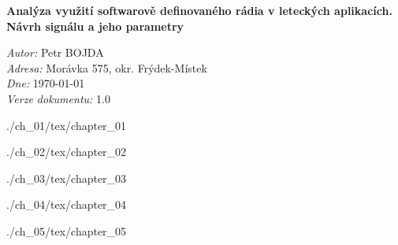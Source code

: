 \documentclass[twoside,11pt]{article}
\begin{document}
\begin{titlepage}



\center %






{ \huge \bfseries Analýza využití softwarově definovaného rádia v leteckých aplikacích.}\\[2in] %
\fontsize{17}{12}\textbf{\textcolor{bgr_DarkBlue}{Návrh signálu a jeho parametry}}\\[4in]
        
\begin{minipage}{0.9\textwidth}
\begin{flushleft} \large
\emph{Autor:} Petr \textsc{BOJDA}\\

\emph{Adresa:} Morávka 575, okr. Frýdek-Místek\\
\emph{Dne:} \today\\
\emph{Verze dokumentu:} 1.0
\end{flushleft}
\end{minipage}


\end{titlepage}

 {./ch_01/tex/chapter_01}

 {./ch_02/tex/chapter_02}

 {./ch_03/tex/chapter_03}

 {./ch_04/tex/chapter_04}


 {./ch_05/tex/chapter_05}
\end{document}
